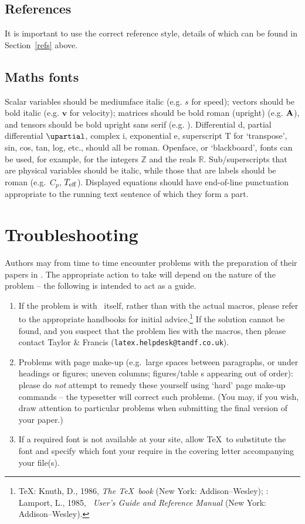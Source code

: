 \documentclass[]{cJEN2e}
\begin{document}
\subsection{References}

It is important to use the correct reference style, details  of which can be found in Section~\ref{refs} above.

\subsection{Maths fonts}
Scalar  variables should be mediumface italic (e.g. $s$ for
speed); vectors should be bold italic (e.g. $\bm v$ for velocity);
matrices should be bold roman (upright) (e.g. $\bf A$), and
tensors should be bold upright sans serif (e.g. {}). Differential d, partial differential $\upartial$, complex i,
exponential e, superscript T for `transpose', sin, cos, tan, log,
etc., should all be roman. Openface, or `blackboard', fonts can be
used, for example, for the integers $\mathbb Z$ and the reals
$\mathbb R$. Sub/superscripts that are physical variables should
be italic, while those  that are labels should be roman (e.g.\
$C_p$, $T_{\rm eff}$). Displayed equations should have end-of-line
punctuation appropriate to the running text sentence of which they
form a part.


\section{Troubleshooting}

Authors may from time to time encounter problems with the  preparation
of their papers in \LaTeXe. The appropriate  action  to
take will depend on the nature of the problem -- the following is
intended to act as a guide.
%
\begin{enumerate}
\item[(i)] If the problem is with \LaTeXe\ itself, rather than with the
actual macros, please refer to the appropriate handbooks for
initial advice.\footnote{\TeX: Knuth, D., 1986, {\it The \TeX\
book} (New York: Addison--Wesley); \LaTeXe: Lamport, L., 1985,
{\it \LaTeXe\ \nobreak User's Guide and Reference Manual} (New
York: Addison--Wesley).} If the solution cannot be found, and you
suspect that the problem lies with the macros, then please contact
Taylor \& Francis ({\tt latex.helpdesk@tandf.co.uk}).

\item[(ii)] Problems with page make-up (e.g.\ large spaces between paragraphs, or under headings or
figures; uneven columns; figures/table
s appearing out of order):
please do {\itshape not\/} attempt to remedy these yourself using
`hard' page make-up commands -- the typesetter will correct such
problems. (You may, if you wish, draw attention to particular
problems when submitting the final version of your paper.)

\item[(iii)] If a required font is not available at your site, allow \TeX\
to substitute the font and specify which font your require in the
covering letter accompanying your file(s).

\end{enumerate}
\end{document}
